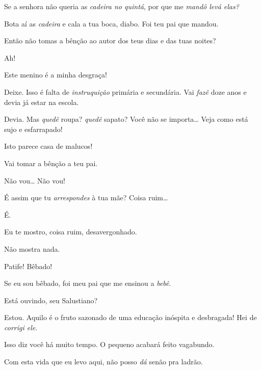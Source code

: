   Se a senhora
não queria as \textit{cadeira no
quintá}, por que me \textit{mandô
levá elas?} 

 Bota aí as
\textit{cadeira} e cala a tua boca, diabo. Foi teu
pai que mandou.

  
Então não tomas a bênção ao autor dos teus
dias e das tuas noites?

  
Ah! 

 Este menino
é a minha desgraça!

 Deixe. Isso
é falta de \textit{instruquição} primária e
secundária. Vai \textit{fazê} doze anos e devia já
estar na escola.

 Devia. Mas
\textit{quedê} roupa? \textit{quedê}
sapato? Você não se importa\ldots{} 
 Veja como está sujo e
esfarrapado!

 Isto parece casa de
malucos!

 Vai tomar a
bênção a teu pai.

 Não vou\ldots{} Não vou!

 É assim que tu
\textit{arrespondes} à tua mãe?
Coisa ruim\ldots

 É.

  Eu te mostro, coisa ruim,
desavergonhado.

  Não mostra
nada.

 Patife! Bêbado!

 Se eu sou
bêbado, foi meu pai que me ensinou a
\textit{bebê}. 

 Está ouvindo,
seu Salustiano?

 Estou. Aquilo
é o fruto sazonado de uma educação inóspita
e desbragada! Hei de \textit{corrigi ele}.

 Isso diz
você há muito tempo. O pequeno acabará
feito vagabundo.

  Com esta vida que
eu levo aqui, não posso \textit{dá} senão
pra ladrão.

